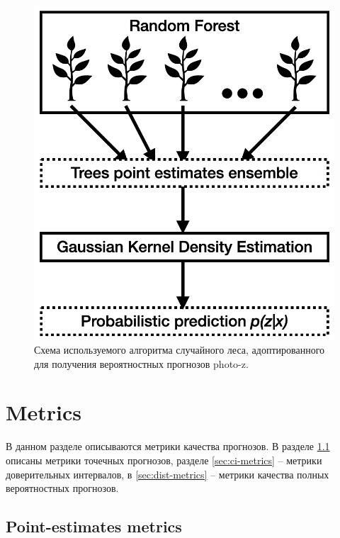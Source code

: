 \documentclass[fleqn,usenatbib]{mnras}
\begin{document}
\begin{figure}
    \centering
    \includegraphics[width=0.95\linewidth]{images/qrf.png}
    \caption{Схема используемого алгоритма случайного леса, адоптированного для получения вероятностных прогнозов photo-z.}
    \label{fig:qrf_scheme}
\end{figure}

\section{Metrics}

В данном разделе описываются метрики качества прогнозов. В разделе \ref{sec:point-metrics} описаны метрики точечных прогнозов, разделе \ref{sec:ci-metrics} -- метрики доверительных интервалов, в \ref{sec:dist-metrics} -- метрики качества полных вероятностных прогнозов.

\subsection{Point-estimates metrics}\label{sec:point-metrics}
\end{document}
